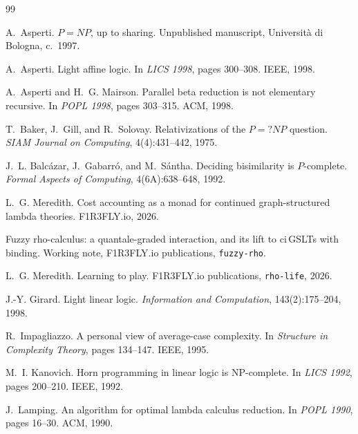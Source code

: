 \documentclass[11pt]{article}
\theoremstyle{definition}
\theoremstyle{plain}
\theoremstyle{remark}
\begin{document}
\begin{thebibliography}{99}

A.~Asperti.
\newblock $P = NP$, up to sharing.
\newblock Unpublished manuscript, Università di Bologna, c.\ 1997.

A.~Asperti.
\newblock Light affine logic.
\newblock In \emph{LICS 1998}, pages 300--308. IEEE, 1998.

A.~Asperti and H.~G. Mairson.
\newblock Parallel beta reduction is not elementary recursive.
\newblock In \emph{POPL 1998}, pages 303--315. ACM, 1998.

T.~Baker, J.~Gill, and R.~Solovay.
\newblock Relativizations of the $P =? NP$ question.
\newblock \emph{SIAM Journal on Computing}, 4(4):431--442, 1975.

J.~L. Balc\'azar, J.~Gabarr\'o, and M.~S\'antha.
\newblock Deciding bisimilarity is $P$-complete.
\newblock \emph{Formal Aspects of Computing}, 4(6A):638--648, 1992.

L.~G. Meredith.
\newblock Cost accounting as a monad for continued graph-structured lambda
theories.
\newblock F1R3FLY.io, 2026.

Fuzzy rho-calculus: a quantale-graded interaction, and its lift to
ci\,GSLTs with binding.
\newblock Working note, F1R3FLY.io publications, \texttt{fuzzy-rho}.

L.~G. Meredith.
\newblock Learning to play.
\newblock F1R3FLY.io publications, \texttt{rho-life}, 2026.

J.-Y. Girard.
\newblock Light linear logic.
\newblock \emph{Information and Computation}, 143(2):175--204, 1998.

R.~Impagliazzo.
\newblock A personal view of average-case complexity.
\newblock In \emph{Structure in Complexity Theory}, pages 134--147. IEEE,
1995.

M.~I. Kanovich.
\newblock Horn programming in linear logic is {NP}-complete.
\newblock In \emph{LICS 1992}, pages 200--210. IEEE, 1992.

J.~Lamping.
\newblock An algorithm for optimal lambda calculus reduction.
\newblock In \emph{POPL 1990}, pages 16--30. ACM, 1990.


\end{thebibliography}
\end{document}

